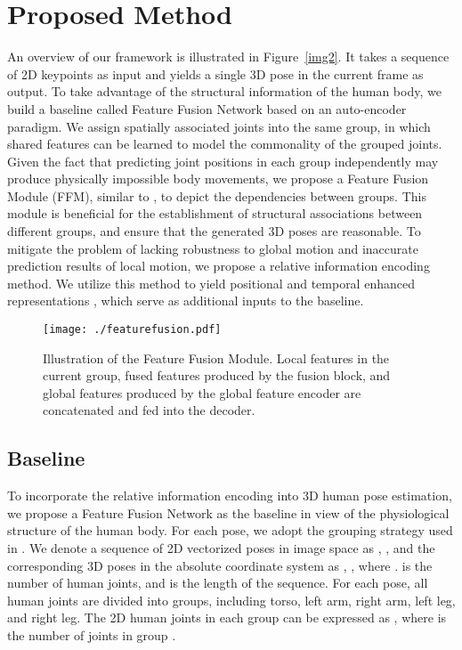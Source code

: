 \documentclass[sigconf]{acmart}
\begin{document}
\section{Proposed Method}
An overview of our framework is illustrated in Figure~\ref{img2}. It takes a sequence of 2D keypoints as input and yields a single 3D pose in the current frame as output. To take advantage of the structural information of the human body, we build a baseline called Feature Fusion Network based on an auto-encoder paradigm. We assign spatially associated joints into the same group, in which shared features can be learned to model the commonality of the grouped joints. Given the fact that predicting joint positions in each group independently may produce physically impossible body movements, we propose a Feature Fusion Module (FFM), similar to \cite{zeng2020srnet}, to depict the dependencies between groups. This module is beneficial for the establishment of structural associations between different groups, and ensure that the generated 3D poses are reasonable. To mitigate the problem of lacking robustness to global motion and inaccurate prediction results of local motion, we propose a relative information encoding method. We utilize this method to yield positional and temporal enhanced representations , which serve as additional inputs to the baseline.

\begin{figure}
  \centering
  \texttt{[image: ./featurefusion.pdf]}
  \vspace{-0.4cm}
  \caption{Illustration of the Feature Fusion Module. Local features in the current group, fused features produced by the fusion block, and global features produced by the global feature encoder are concatenated and fed into the decoder.}
  \vspace{-0.3cm}
  \label{img3}
\end{figure}


\subsection{Baseline}\label{baseline}


To incorporate the relative information encoding into 3D human pose estimation, we propose a Feature Fusion Network as the baseline in view of the physiological structure of the human body. For each pose, we adopt the grouping strategy used in \cite{park20183d}. We denote a sequence of 2D vectorized poses in image space as  , , and the corresponding 3D poses in the absolute coordinate system as  , , where .  is the number of human joints, and  is the length of the sequence. For each pose, all human joints are divided into  groups, including torso, left arm, right arm, left leg, and right leg. The 2D human joints in each group can be expressed as , where  is the number of joints in group . 
\end{document}
